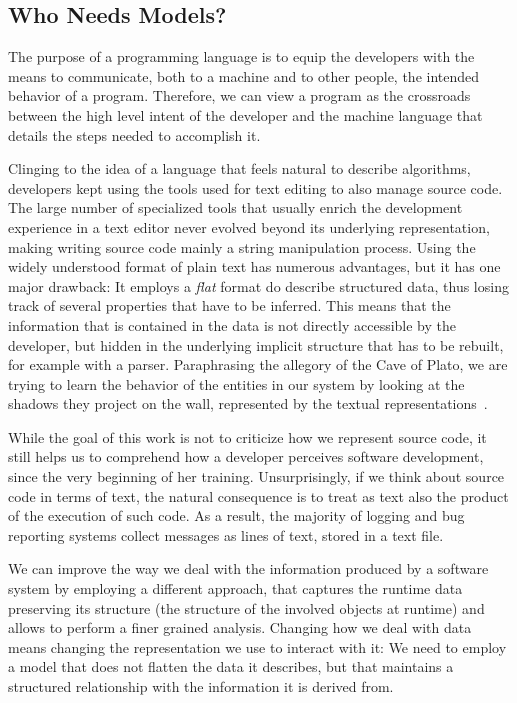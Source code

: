 \subsection{Who Needs Models?}

The purpose of a programming language is to equip the developers with the means to communicate, both to a machine and to other people, the intended behavior of a program. Therefore, we can view a program  as the crossroads between the high level intent of the developer and the machine language that details the steps needed to accomplish it.

Clinging to the idea of a language that feels natural to describe algorithms, developers kept using the tools used for text editing to also manage source code.
The large number of specialized tools that usually enrich the development experience in a text editor never evolved beyond its underlying representation, making writing source code mainly a string manipulation process. Using the widely understood format of plain text has numerous advantages, but it has one major drawback: It employs a \emph{flat} format do describe structured data, thus losing track of several properties that have to be inferred.
This means that the information that is contained in the data is not directly accessible by the developer, but hidden in the underlying implicit structure that has to be rebuilt, for example with a parser. Paraphrasing the allegory of the Cave of Plato, we are trying to learn the behavior of the entities in our system by looking at the shadows they project on the wall, represented by the textual representations~\cite{Plato380a}.

While the goal of this work is not to criticize how we represent source code, it still helps us to comprehend how a developer perceives software development, since the very beginning of her training. Unsurprisingly, if we think about source code in terms of text, the natural consequence is to treat as text also the product of the execution of such code.
As a result, the majority of logging and bug reporting systems collect messages as lines of text, stored in a text file.

We can improve the way we deal with the information produced by a software system by employing a different approach, that captures the runtime data preserving its structure (\eg the structure of the involved objects at runtime) and allows to perform a finer grained analysis. Changing how we deal with data means changing the representation we use to interact with it: We need to employ a model that does not flatten the data it describes, but that maintains a structured relationship with the information it is derived from.


